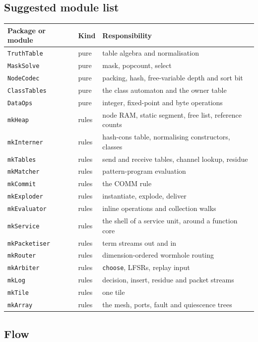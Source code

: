 \documentclass[11pt]{article}
\newcommand{\kw}[1]{\texttt{#1}}
\theoremstyle{definition}
\theoremstyle{remark}
\begin{document}
\subsection{Suggested module list}

\noindent
\begin{tabularx}{\textwidth}{@{}l l X@{}}
\toprule
Package or module & Kind & Responsibility\\
\midrule
\kw{TruthTable}   & pure & table algebra and normalisation\\
\kw{MaskSolve}    & pure & mask, popcount, select\\
\kw{NodeCodec}    & pure & packing, hash, free-variable depth and sort bit\\
\kw{ClassTables}  & pure & the class automaton and the owner table\\
\kw{DataOps}      & pure & integer, fixed-point and byte operations\\
\kw{mkHeap}       & rules & node RAM, static segment, free list, reference counts\\
\kw{mkInterner}   & rules & hash-cons table, normalising constructors, classes\\
\kw{mkTables}     & rules & send and receive tables, channel lookup, residue\\
\kw{mkMatcher}    & rules & pattern-program evaluation\\
\kw{mkCommit}     & rules & the COMM rule\\
\kw{mkExploder}   & rules & instantiate, explode, deliver\\
\kw{mkEvaluator}  & rules & inline operations and collection walks\\
\kw{mkService}    & rules & the shell of a service unit, around a function core\\
\kw{mkPacketiser} & rules & term streams out and in\\
\kw{mkRouter}     & rules & dimension-ordered wormhole routing\\
\kw{mkArbiter}    & rules & \kw{choose}, LFSRs, replay input\\
\kw{mkLog}        & rules & decision, insert, residue and packet streams\\
\kw{mkTile}       & rules & one tile\\
\kw{mkArray}      & rules & the mesh, ports, fault and quiescence trees\\
\bottomrule
\end{tabularx}

\subsection{Flow}
\end{document}
